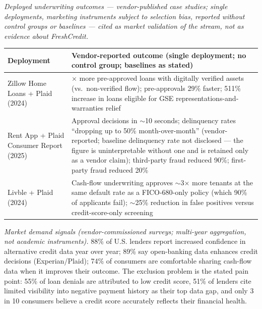 \documentclass[
]{article}
\newcounter{none} %
\begin{document}
\emph{Deployed underwriting outcomes --- vendor-published case studies;
single deployments, marketing instruments subject to selection bias,
reported without control groups or baselines --- cited as market
validation of the stream, not as evidence about FreshCredit.}

{\def\LTcaptype{none} %
\begin{longtable}[]{@{}
  >{\raggedright\arraybackslash}p{}
  >{\raggedright\arraybackslash}p{}@{}}
\toprule\noalign{}
\begin{minipage}[b]{\linewidth}\raggedright
Deployment
\end{minipage} & \begin{minipage}[b]{\linewidth}\raggedright
Vendor-reported outcome (single deployment; no control group; baselines
as stated)
\end{minipage} \\
\midrule\noalign{}
\endhead
\bottomrule\noalign{}
\endlastfoot
Zillow Home Loans + Plaid (2024) & 3.2\(\times\) more pre-approved loans
with digitally verified assets (vs.~non-verified flow); pre-approvals
29\% faster; 511\% increase in loans eligible for GSE
representations-and-warranties relief \\
Rent App + Plaid Consumer Report (2025) & Approval decisions in
\(\sim\)10 seconds; delinquency rates ``dropping up to 50\%
month-over-month'' (vendor-reported; baseline delinquency rate not
disclosed --- the figure is uninterpretable without one and is retained
only as a vendor claim); third-party fraud reduced 90\%; first-party
fraud reduced 20\% \\
Livble + Plaid (2024) & Cash-flow underwriting approves
\(\sim\)3\(\times\) more tenants at the same default rate as a
FICO-680-only policy (which 90\% of applicants fail); \(\sim\)25\%
reduction in false positives versus credit-score-only screening \\
\end{longtable}
}

\emph{Market demand signals (vendor-commissioned surveys; multi-year
aggregation, not academic instruments).} 88\% of U.S. lenders report
increased confidence in alternative credit data year over year; 89\% say
open-banking data enhances credit decisions (Experian/Plaid); 74\% of
consumers are comfortable sharing cash-flow data when it improves their
outcome. The exclusion problem is the stated pain point: 55\% of loan
denials are attributed to low credit score, 51\% of lenders cite limited
visibility into negative payment history as their top data gap, and only
3 in 10 consumers believe a credit score accurately reflects their
financial health.
\end{document}
